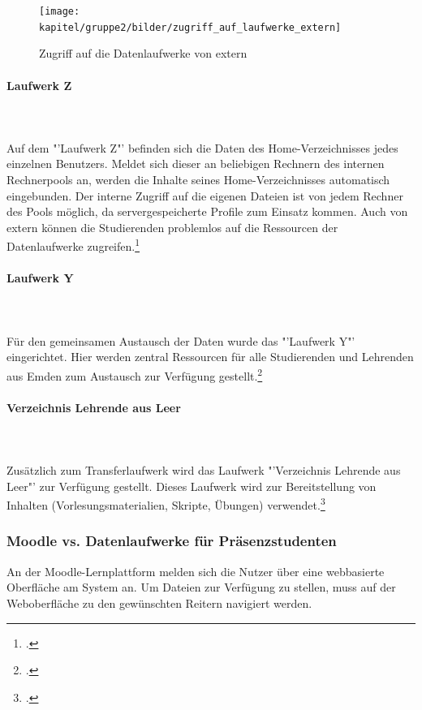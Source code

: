 \begin{figure}[h!]
	\centering
	\texttt{[image: kapitel/gruppe2/bilder/zugriff\_auf\_laufwerke\_extern]}
	\caption{Zugriff auf die Datenlaufwerke von extern \protect\footnotemark}
	\label{fig_zugriff_datenlaufwerke_extern}
\end{figure}


\paragraph{Laufwerk Z}\mbox{}\\\\

Auf dem "'Laufwerk Z"' befinden sich die Daten des Home-Verzeichnisses jedes einzelnen Benutzers. Meldet sich dieser an beliebigen Rechnern des internen Rechnerpools an, werden die Inhalte seines Home-Verzeichnisses automatisch eingebunden. Der interne Zugriff auf die eigenen Dateien ist von jedem Rechner des Pools möglich, da servergespeicherte Profile zum Einsatz kommen. Auch von extern können die Studierenden problemlos auf die Ressourcen der Datenlaufwerke zugreifen.\footcite{gunter_muller_interview}

\paragraph{Laufwerk Y}\mbox{}\\\\

Für den gemeinsamen Austausch der Daten wurde das "'Laufwerk Y"' eingerichtet. Hier werden zentral Ressourcen für alle Studierenden und Lehrenden aus Emden zum Austausch zur Verfügung gestellt.\footcite{gunter_muller_interview}

\paragraph{Verzeichnis Lehrende aus Leer}\mbox{}\\\\
Zusätzlich zum Transferlaufwerk wird das Laufwerk "'Verzeichnis Lehrende aus Leer"' zur Verfügung gestellt. Dieses Laufwerk wird zur Bereitstellung von Inhalten (Vorlesungsmaterialien, Skripte, Übungen) verwendet.\footcite{gunter_muller_interview}

\subsubsection{Moodle vs. Datenlaufwerke für Präsenzstudenten}
An der Moodle-Lernplattform melden sich die Nutzer über eine webbasierte Oberfläche am System an. Um Dateien zur Verfügung zu stellen, muss auf der Weboberfläche zu den gewünschten Reitern navigiert werden.

